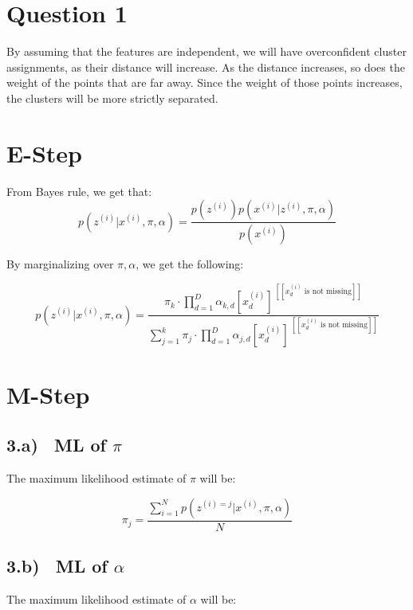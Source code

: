 \documentclass[letterpaper, 12pt]{article}
\begin{document}
\section{Question 1}
By assuming that the features are independent, we will have overconfident cluster assignments, as their distance will increase.  As the distance increases, so does the weight of the points that are far away. Since the weight of those points increases, the clusters will be more strictly separated.

\section{ E-Step}

From Bayes rule, we get that:
\begin{equation*}
    p(z^{(i)} \vert x^{(i)}, \pi, \alpha) = \frac{p(z^{(i)})p(x^{(i)} \vert z^{(i)}, \pi, \alpha)}{p(x^{(i)})}
\end{equation*}


By marginalizing over \(\pi,\alpha \), we get the following:

\begin{equation*}
    p(z^{(i)} \vert x^{(i)}, \pi, \alpha) = 
    \frac{\pi_k \cdot \prod_{d=1}^D \alpha_{k,d} [x_d^{(i)}]^{
    \ [\![ x_d^{(i)} \text{  is not missing}]\!]}} 
    {\sum_{j=1}^k\pi_j \cdot \prod_{d=1}^D\alpha_{j,d} [x_d^{(i)}]^{ 
    \ [\![ x_d^{(i)} \text{  is not missing}]\!]}}
\end{equation*}

\section{ M-Step}
\subsection*{3.a) \ ML of $\pi$}
The maximum likelihood estimate of $\pi$ will be:

\begin{equation*}
    \pi_j = \frac
    {\sum_{i=1}^N p(z^{(i)=j} \vert x^{(i)}, \pi, \alpha )}
    {N}
\end{equation*}

\subsection*{3.b) \ ML of $\alpha$}

The maximum likelihood estimate of $\alpha$ will be:
\end{document}

